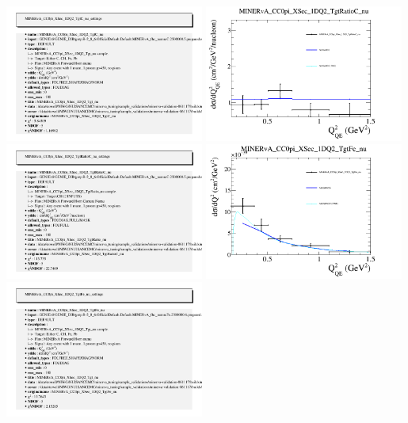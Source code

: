 \documentclass{article}
\begin{document}
\includegraphics[width=0.49\textwidth]{figures/nuisance_MINERvA_CC0pi_XSec_1DQ2_TgtC_nu_info.png}
\centering
\includegraphics[width=0.49\textwidth]{figures/nuisance_MINERvA_CC0pi_XSec_1DQ2_TgtRatioC_nu_comp.png}
\includegraphics[width=0.49\textwidth]{figures/nuisance_MINERvA_CC0pi_XSec_1DQ2_TgtRatioC_nu_info.png}
\centering
\includegraphics[width=0.49\textwidth]{figures/nuisance_MINERvA_CC0pi_XSec_1DQ2_TgtFe_nu_comp.png}
\includegraphics[width=0.49\textwidth]{figures/nuisance_MINERvA_CC0pi_XSec_1DQ2_TgtFe_nu_info.png}
\end{document}
